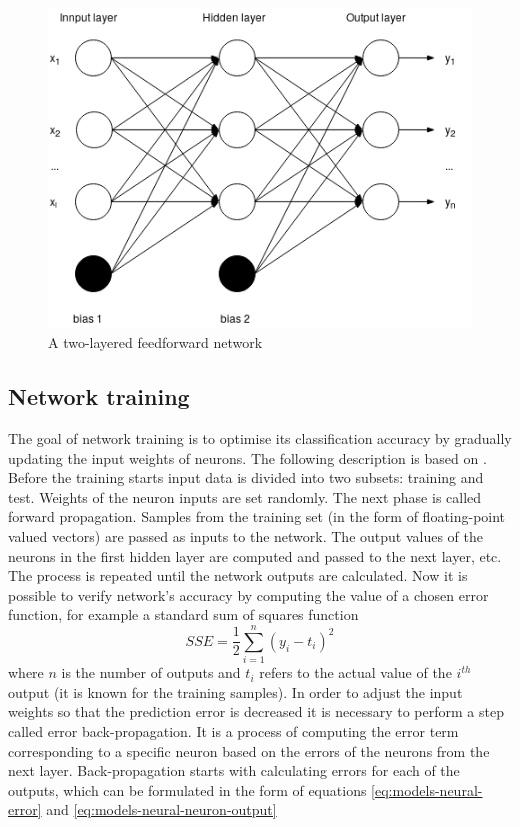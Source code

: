 \begin{figure}[H]
\centering
\includegraphics[scale=0.6]{figures/models/feedforward-network.png}
\caption{A two-layered feedforward network}
\label{fig:models-feedforward-network}
\end{figure}

\subsection*{Network training}\label{ssec:network-training}
The goal of network training is to optimise its classification accuracy by gradually updating the input weights of neurons. The following description is based on \cite{HAN2005}.
Before the training starts input data is divided into two subsets: training and test. Weights of the neuron inputs are set randomly.
The next phase is called forward propagation. Samples from the training set (in the form of floating-point valued vectors) are passed as inputs to the network. The output values of the neurons in the first hidden layer are computed and passed to the next layer, etc. The process is repeated until the network outputs are calculated.
Now it is possible to verify network's accuracy by computing the value of a chosen error function, for example a standard sum of squares function
\begin{equation}
SSE = \frac{1}{2}\sum_{i=1}^{n}(y_i - t_i)^2
\end{equation}
where $n$ is the number of outputs and $t_i$ refers to the actual value of the $i^{th}$ output (it is known for the training samples).
In order to adjust the input weights so that the prediction error is decreased it is necessary to perform a step called error back-propagation. It is a process of computing the error term corresponding to a specific neuron based on the errors of the neurons from the next layer. Back-propagation starts with calculating errors for each of the outputs, which can be formulated in the form of equations \ref{eq:models-neural-error} and \ref{eq:models-neural-neuron-output}

